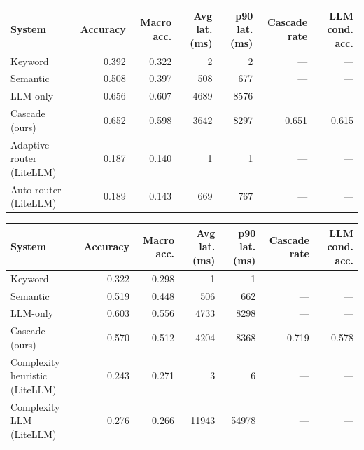 \begin{tabular}{l r r r r r r}
  \toprule
  System & Accuracy & Macro acc. & Avg lat. (ms) & p90 lat. (ms) & Cascade rate & LLM cond. acc. \\
  \midrule
  Keyword & 0.392 & 0.322 & 2 & 2 & --- & --- \\
  Semantic & 0.508 & 0.397 & 508 & 677 & --- & --- \\
  LLM-only & 0.656 & 0.607 & 4689 & 8576 & --- & --- \\
  Cascade (ours) & 0.652 & 0.598 & 3642 & 8297 & 0.651 & 0.615 \\
  Adaptive router (LiteLLM) & 0.187 & 0.140 & 1 & 1 & --- & --- \\
  Auto router (LiteLLM) & 0.189 & 0.143 & 669 & 767 & --- & --- \\
  \bottomrule
\end{tabular}

\begin{tabular}{l r r r r r r}
  \toprule
  System & Accuracy & Macro acc. & Avg lat. (ms) & p90 lat. (ms) & Cascade rate & LLM cond. acc. \\
  \midrule
  Keyword & 0.322 & 0.298 & 1 & 1 & --- & --- \\
  Semantic & 0.519 & 0.448 & 506 & 662 & --- & --- \\
  LLM-only & 0.603 & 0.556 & 4733 & 8298 & --- & --- \\
  Cascade (ours) & 0.570 & 0.512 & 4204 & 8368 & 0.719 & 0.578 \\
  Complexity heuristic (LiteLLM) & 0.243 & 0.271 & 3 & 6 & --- & --- \\
  Complexity LLM (LiteLLM) & 0.276 & 0.266 & 11943 & 54978 & --- & --- \\
  \bottomrule
\end{tabular}
